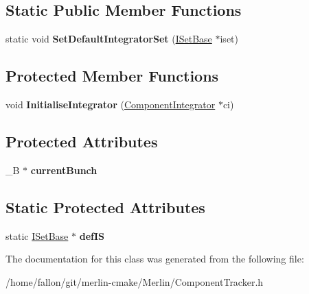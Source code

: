\subsection*{Static Public Member Functions}
\begin{DoxyCompactItemize}
\item 
\mbox{\label{classTBunchCMPTracker_a8323ab95e042c994826fb2afdef7a495}} 
static void {\bfseries Set\+Default\+Integrator\+Set} (\hyperlink{classTBunchCMPTracker_1_1ISetBase}{I\+Set\+Base} $\ast$iset)
\end{DoxyCompactItemize}
\subsection*{Protected Member Functions}
\begin{DoxyCompactItemize}
\item 
\mbox{\label{classTBunchCMPTracker_a5f2eba3460dc1043bd629267cb242100}} 
void {\bfseries Initialise\+Integrator} (\hyperlink{classComponentIntegrator}{Component\+Integrator} $\ast$ci)
\end{DoxyCompactItemize}
\subsection*{Protected Attributes}
\begin{DoxyCompactItemize}
\item 
\mbox{\label{classTBunchCMPTracker_ab7c6bbcd88e7b09ecdf26888a8a50f83}} 
\+\_\+B $\ast$ {\bfseries current\+Bunch}
\end{DoxyCompactItemize}
\subsection*{Static Protected Attributes}
\begin{DoxyCompactItemize}
\item 
\mbox{\label{classTBunchCMPTracker_aa2500cb13ccba23c1b04b566b9f8cda8}} 
static \hyperlink{classTBunchCMPTracker_1_1ISetBase}{I\+Set\+Base} $\ast$ {\bfseries def\+IS}
\end{DoxyCompactItemize}


The documentation for this class was generated from the following file\+:\begin{DoxyCompactItemize}
\item 
/home/fallon/git/merlin-\/cmake/\+Merlin/Component\+Tracker.\+h\end{DoxyCompactItemize}
